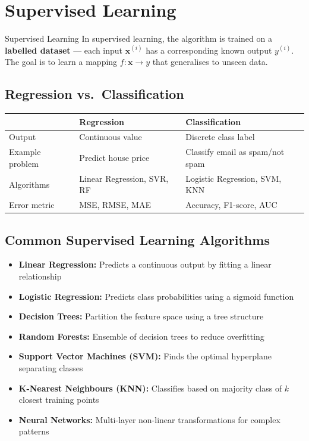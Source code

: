 \documentclass[12pt,a4paper]{report}
\begin{document}
\section{Supervised Learning}

\begin{defbox}{Supervised Learning}
In supervised learning, the algorithm is trained on a \textbf{labelled dataset} --- each input $\mathbf{x}^{(i)}$ has a corresponding known output $y^{(i)}$. The goal is to learn a mapping $f: \mathbf{x} \rightarrow y$ that generalises to unseen data.
\end{defbox}

\subsection{Regression vs.\ Classification}

\begin{center}
\begin{tabular}{lll}
\toprule
 & \textbf{Regression} & \textbf{Classification} \\
\midrule
Output & Continuous value & Discrete class label \\
Example problem & Predict house price & Classify email as spam/not spam \\
Algorithms & Linear Regression, SVR, RF & Logistic Regression, SVM, KNN \\
Error metric & MSE, RMSE, MAE & Accuracy, F1-score, AUC \\
\bottomrule
\end{tabular}
\end{center}

\subsection{Common Supervised Learning Algorithms}

\begin{itemize}
  \item \textbf{Linear Regression:} Predicts a continuous output by fitting a linear relationship
  \item \textbf{Logistic Regression:} Predicts class probabilities using a sigmoid function
  \item \textbf{Decision Trees:} Partition the feature space using a tree structure
  \item \textbf{Random Forests:} Ensemble of decision trees to reduce overfitting
  \item \textbf{Support Vector Machines (SVM):} Finds the optimal hyperplane separating classes
  \item \textbf{K-Nearest Neighbours (KNN):} Classifies based on majority class of $k$ closest training points
  \item \textbf{Neural Networks:} Multi-layer non-linear transformations for complex patterns
\end{itemize}
\end{document}
